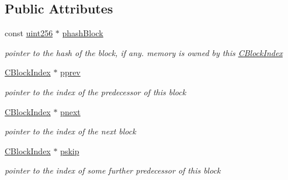 \subsection*{Public Attributes}
\begin{DoxyCompactItemize}
\item 
\mbox{\label{class_c_block_index_afac8099e03ffda463c7153ca82d37b66}} 
const \mbox{\hyperlink{classuint256}{uint256}} $\ast$ \mbox{\hyperlink{class_c_block_index_afac8099e03ffda463c7153ca82d37b66}{phash\+Block}}
\begin{DoxyCompactList}\small\item\em pointer to the hash of the block, if any. memory is owned by this \mbox{\hyperlink{class_c_block_index}{C\+Block\+Index}} \end{DoxyCompactList}\item 
\mbox{\label{class_c_block_index_a1ef11137155df1dd5c81491630cece39}} 
\mbox{\hyperlink{class_c_block_index}{C\+Block\+Index}} $\ast$ \mbox{\hyperlink{class_c_block_index_a1ef11137155df1dd5c81491630cece39}{pprev}}
\begin{DoxyCompactList}\small\item\em pointer to the index of the predecessor of this block \end{DoxyCompactList}\item 
\mbox{\label{class_c_block_index_a2f0acd342accaab731d887584b444590}} 
\mbox{\hyperlink{class_c_block_index}{C\+Block\+Index}} $\ast$ \mbox{\hyperlink{class_c_block_index_a2f0acd342accaab731d887584b444590}{pnext}}
\begin{DoxyCompactList}\small\item\em pointer to the index of the next block \end{DoxyCompactList}\item 
\mbox{\label{class_c_block_index_ab6242bb77bc01617f5b402d14e6a3883}} 
\mbox{\hyperlink{class_c_block_index}{C\+Block\+Index}} $\ast$ \mbox{\hyperlink{class_c_block_index_ab6242bb77bc01617f5b402d14e6a3883}{pskip}}
\begin{DoxyCompactList}\small\item\em pointer to the index of some further predecessor of this block \end{DoxyCompactList}\item 

\end{DoxyCompactItemize}
